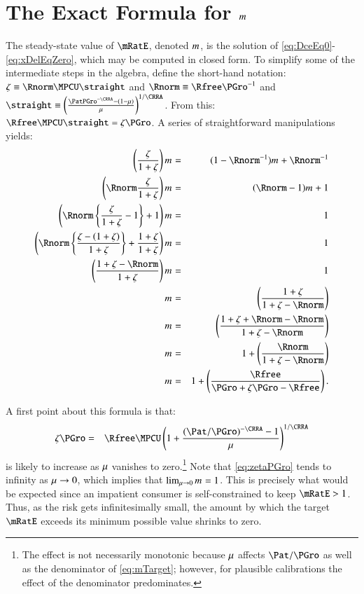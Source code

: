 \section{The Exact Formula for $\mTarg^{\null}$}
The steady-state value of $\mRatE$, denoted $\mTarg^{\null}$, is the solution of \eqref{eq:DceEq0}-\eqref{eq:xDelEqZero}, which may be computed in closed form. To simplify some of the intermediate steps in the algebra, define the short-hand notation: 
$\zeta \equiv \Rnorm \MPCU \straight$ and
$\Rnorm \equiv \Rfree\PGro^{-1}$ and 
$\straight\equiv\left(\frac{\PatPGro^{-\CRRA}-\erate}{\urate}\right)^{1/\CRRA}$. From this: $\Rfree \MPCU \straight = \zeta \PGro$.  
A series of straightforward manipulations yields:
\begin{eqnarray}
  \left(\frac{\zeta}{1+\zeta}\right)\mTarg^{\null} & = & (1-\Rnorm^{-1})\mTarg^{\null}+\Rnorm^{-1} \notag
\\  \left(\Rnorm\frac{\zeta}{1+\zeta}\right)\mTarg^{\null} & = & (\Rnorm-1)\mTarg^{\null}+1 \notag
\\  \left(\Rnorm\left\{\frac{\zeta}{1+\zeta}-1\right\}+1\right)\mTarg^{\null} & = & 1 \notag
\\  \left(\Rnorm\left\{\frac{\zeta-(1+\zeta)}{1+\zeta}\right\}+\frac{1+\zeta}{1+\zeta}\right)\mTarg^{\null} & = & 1 \notag
\\  \left(\frac{1+\zeta-\Rnorm}{1+\zeta}\right)\mTarg^{\null} & = & 1 \notag
\\  \mTarg^{\null} & = & \left(\frac{1+\zeta}{1+\zeta-\Rnorm}\right) \notag
\\  \mTarg^{\null} & = & \left(\frac{1+\zeta+\Rnorm-\Rnorm}{1+\zeta-\Rnorm}\right) \notag
\\  \mTarg^{\null} & = & 1 + \left(\frac{\Rnorm}{1+\zeta-\Rnorm}\right) \notag
\\  \mTarg^{\null} & = & 1 + \left(\frac{\Rfree}{\PGro+\zeta\PGro-\Rfree}\right)  \label{eq:mTarget}
.
\end{eqnarray}

A first point about this formula is that:
\begin{eqnarray}
  \zeta\PGro & = & \Rfree \MPCU \left(1+\frac{(\Pat/\PGro)^{-\CRRA} - 1}{\urate}\right)^{1/\CRRA}
\label{eq:zetaPGro}
\end{eqnarray}
is likely to increase as $\mu$ vanishes to zero.\footnote{The effect is
  not necessarily monotonic because $\mu$ affects $\Pat/\PGro$ 
  as well as the denominator of \eqref{eq:mTarget}; however, for
  plausible calibrations the effect of the denominator predominates.}
Note that \eqref{eq:zetaPGro} tends to infinity as $\mu \rightarrow 0$, which implies that $\lim_{\urate \rightarrow 0} \mTarg^{\null} = 1$.  
This is precisely what would be expected since an impatient consumer is self-constrained to keep 
$\mRatE > 1$.  
Thus, as the risk gets infinitesimally small, the
amount by which the target $\mRatE$ exceeds its minimum possible value shrinks to zero.

